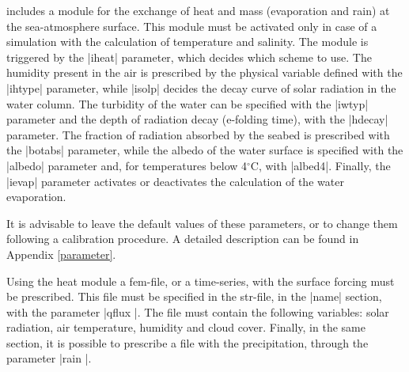 
%
%
%
%
%
%
%
\shy{} includes a module for the exchange of heat and mass (evaporation and rain) at the sea-atmosphere surface. This module must be activated only in case of a simulation with the calculation of temperature and salinity. The module is triggered by the |iheat| parameter, which decides which scheme to use. The humidity present in the air is prescribed by the physical variable defined with the |ihtype| parameter, while |isolp| decides the decay curve of solar radiation in the water column. The turbidity of the water can be specified with the |iwtyp| parameter and the depth of radiation decay (e-folding time), with the |hdecay| parameter. The fraction of radiation absorbed by the seabed is prescribed with the |botabs| parameter, while the albedo of the water
surface is specified with the |albedo| parameter and, for temperatures below 4$^{\circ}$C, with |albed4|. Finally, the |ievap| parameter activates or deactivates the calculation of the water evaporation.

It is advisable to leave the default values of these parameters, or to change them following a calibration procedure. A detailed description can be found in Appendix \ref{parameter}.

Using the heat module a fem-file, or a time-series, with the surface forcing must be prescribed. This file must be specified in the str-file, in the |name| section, with the parameter |qflux |. The file must contain the following variables: solar radiation, air temperature, humidity and cloud cover. Finally, in the same section, it is possible to prescribe a file with the precipitation, through the parameter |rain |.
